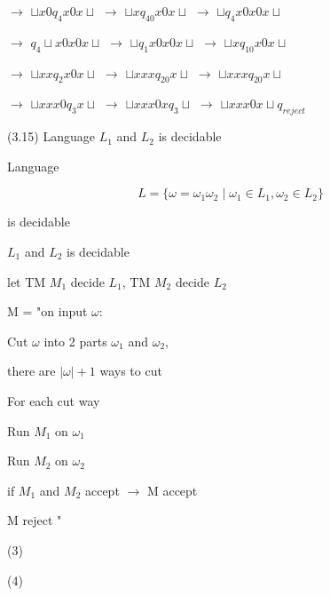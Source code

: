 \documentclass{article}
\begin{document}
$\to$ ${\sqcup}x0q_4x0x{\sqcup}$ $\to$ ${\sqcup}xq_40x0x{\sqcup}$ $\to$ ${\sqcup}q_4x0x0x{\sqcup}$
 
$\to$ $q_4{\sqcup}x0x0x{\sqcup}$ $\to$ ${\sqcup}q_1x0x0x{\sqcup}$ $\to$ ${\sqcup}xq_10x0x{\sqcup}$ 

$\to$ ${\sqcup}xxq_2x0x{\sqcup}$ $\to$ ${\sqcup}xxxq_20x{\sqcup}$ $\to$ ${\sqcup}xxxq_20x{\sqcup}$ 

$\to$ ${\sqcup}xxx0q_3x{\sqcup}$ $\to$ ${\sqcup}xxx0xq_3{\sqcup}$ $\to$ ${\sqcup}xxx0x{\sqcup}q_{reject}$

\vspace{5mm}

\hspace{0.5cm}(3.15) Language $L_1$ and $L_2$ is decidable

\hspace{0.5cm}Language 

$$L = \{ {\omega} = {\omega}_1{\omega}_2 \mid {\omega}_1 \in L_1, {\omega}_2 \in L_2 \}$$

\hspace{0.5cm}is decidable

\vspace{5mm}

\hspace{0.5cm} $L_1$ and $L_2$ is decidable

\hspace{0.5cm} let TM $M_1$ decide $L_1$, TM $M_2$ decide $L_2$

\hspace{0.5cm} M = "on input $\omega$:

\hspace{2cm} Cut $\omega$ into 2 parts ${\omega}_1$ and ${\omega}_2$, 

\hspace{2cm} there are $|\omega| + 1$ ways to cut

\hspace{2cm} For each cut way

\hspace{2.5cm}Run $M_1$ on ${\omega}_1$

\hspace{2.5cm}Run $M_2$ on ${\omega}_2$

\hspace{2.5cm}if $M_1$ and $M_2$ accept $\to$ M accept

\hspace{2cm} M reject "

\vspace{5mm}

\hspace{0.5cm}(3)

\vspace{5mm}

\hspace{0.5cm}(4)

\vspace{5mm}
\end{document}

